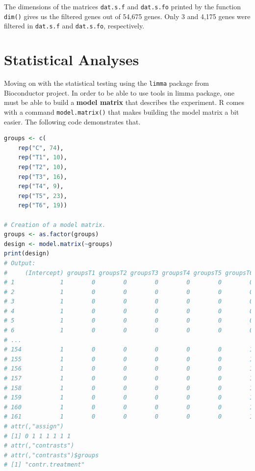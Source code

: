\documentclass[oneside, a4paper, 11pt]{book}
\begin{document}
The dimensions of the matrices \texttt{dat.s.f} and \texttt{dat.s.fo} printed by the function \texttt{dim()} gives us the filtered genes out of 54,675 genes. Only 3 and 4,175 genes were filtered in \texttt{dat.s.f} and \texttt{dat.s.fo}, respectively.

\section{Statistical Analyses}
Moving on with the statistical testing using the \texttt{limma} package from Bioconductor project. In order to be able to use tools in limma package, one must be able to build a \textbf{model matrix} that describes the experiment. R comes with a command \texttt{model.matrix()} that makes building the model matrix a bit easier. The following code demonstrates that.

\begin{lstlisting}[language=R, caption=Design Matrix]
groups <- c(
    rep("C", 74),
    rep("T1", 10),
    rep("T2", 10),
    rep("T3", 16),
    rep("T4", 9),
    rep("T5", 23),
    rep("T6", 19))

# Creation of a model matrix.
groups <- as.factor(groups)
design <- model.matrix(~groups)
print(design)
# Output:
#     (Intercept) groupsT1 groupsT2 groupsT3 groupsT4 groupsT5 groupsT6
# 1             1        0        0        0        0        0        0
# 2             1        0        0        0        0        0        0
# 3             1        0        0        0        0        0        0
# 4             1        0        0        0        0        0        0
# 5             1        0        0        0        0        0        0
# 6             1        0        0        0        0        0        0
# ...
# 154           1        0        0        0        0        0        1
# 155           1        0        0        0        0        0        1
# 156           1        0        0        0        0        0        1
# 157           1        0        0        0        0        0        1
# 158           1        0        0        0        0        0        1
# 159           1        0        0        0        0        0        1
# 160           1        0        0        0        0        0        1
# 161           1        0        0        0        0        0        1
# attr(,"assign")
# [1] 0 1 1 1 1 1 1
# attr(,"contrasts")
# attr(,"contrasts")$groups
# [1] "contr.treatment"

\end{lstlisting}
\end{document}
